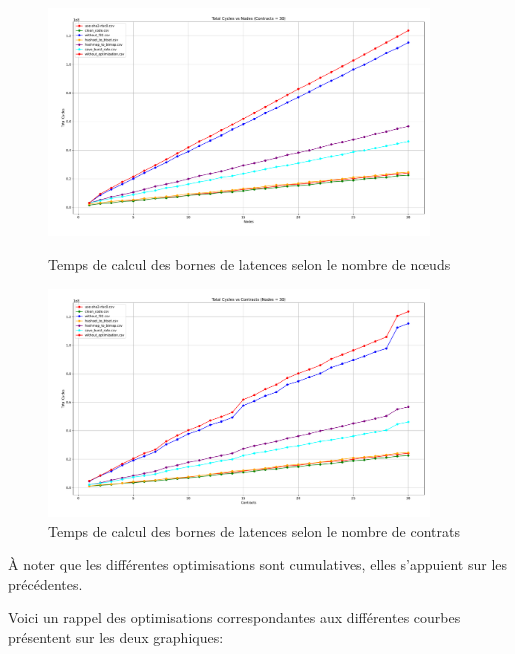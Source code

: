 \documentclass[12pt]{report}
\begin{document}
\begin{figure}[H]
    \centering
    \includegraphics[width=0.9\textwidth]{benchmark_contracts.pdf}
    \caption{Temps de calcul des bornes de latences selon le nombre de nœuds}
    \includegraphics[width=0.9\textwidth]{benchmark_nodes.pdf}
    \caption{Temps de calcul des bornes de latences selon le nombre de contrats}
\end{figure}

\break{}

À noter que les différentes optimisations sont cumulatives, elles s'appuient sur les
précédentes.

\smallskip

Voici un rappel des optimisations correspondantes aux différentes courbes
présentent sur les deux graphiques:
\end{document}
